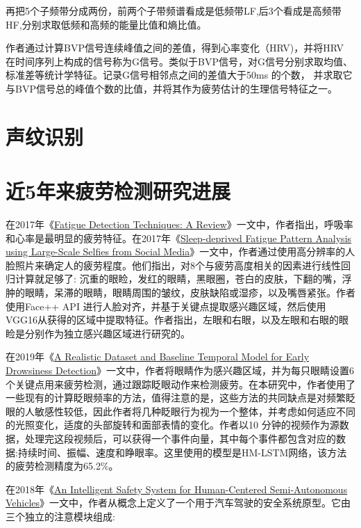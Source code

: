 再把5个子频带分成两份，前两个子带频谱看成是低频带LF,后3个看成是高频带HF,分别求取低频和高频的能量比值和熵比值。

作者通过计算BVP信号连续峰值之间的差值，得到心率变化（HRV)，并将HRV 在时间序列上构成的信号称为G信号。类似于BVP信号，对G信号分别求取均值、标准差等统计学特征。记录G信号相邻点之间的差值大于50ms 的个数，
并求取它与BVP信号总的峰值个数的比值，并将其作为疲劳估计的生理信号特征之一。

\section{声纹识别}

\section{近5年来疲劳检测研究进展}

\cite{malov2019fatigue}

在2017年《\href{}{Fatigue Detection Techniques: A Review}》一文中，作者指出，呼吸率和心率是最明显的疲劳特征。在2017年《\href{https://ieeexplore.ieee.org/abstract/document/8258154/}{Sleep-deprived Fatigue Pattern Analysis using Large-Scale Selfies from Social Media}》一文中，作者通过使用高分辨率的人脸照片来确定人的疲劳程度。他们指出，对8个与疲劳高度相关的因素进行线性回归计算就足够了: 沉重的眼睑，发红的眼睛，黑眼圈，苍白的皮肤，下翻的嘴，浮肿的眼睛，呆滞的眼睛，眼睛周围的皱纹，皮肤缺陷或湿疹，以及嘴唇紧张。作者使用Face++ API 进行人脸对齐，并基于关键点提取感兴趣区域，然后使用VGG16从获得的区域中提取特征。作者指出，左眼和右眼，以及左眼和右眼的眼睑是分别作为独立感兴趣区域进行研究的。

在2019年《\href{https://xueshu.baidu.com/usercenter/paper/show?paperid=10050gc0dx5n0ex09m660eg0dr674514&site=xueshu_se&hitarticle=1}{A Realistic Dataset and Baseline Temporal Model for Early Drowsiness Detection}》一文中，作者将眼睛作为感兴趣区域，并为每只眼睛设置6个关键点用来疲劳检测，通过跟踪眨眼动作来检测疲劳。在本研究中，作者使用了一些现有的计算眨眼频率的方法，值得注意的是，这些方法的共同缺点是对频繁眨眼的人敏感性较低，因此作者将几种眨眼行为视为一个整体，并考虑如何适应不同的光照变化，适度的头部旋转和面部表情的变化。作者以10 分钟的视频作为源数据，处理完这段视频后，可以获得一个事件向量，其中每个事件都包含对应的数据:持续时间、振幅、速度和睁眼率。这里使用的模型是HM-LSTM网络，该方法的疲劳检测精度为65.2$\%$。


在2018年《\href{https://xueshu.baidu.com/usercenter/paper/show?paperid=1f7k0g20h77e0gh0wg5802d0cp212255&site=xueshu_se}{An
Intelligent Safety System for Human-Centered Semi-Autonomous Vehicles}》一文中，作者从概念上定义了一个用于汽车驾驶的安全系统原型。它由三个独立的注意模块组成:

